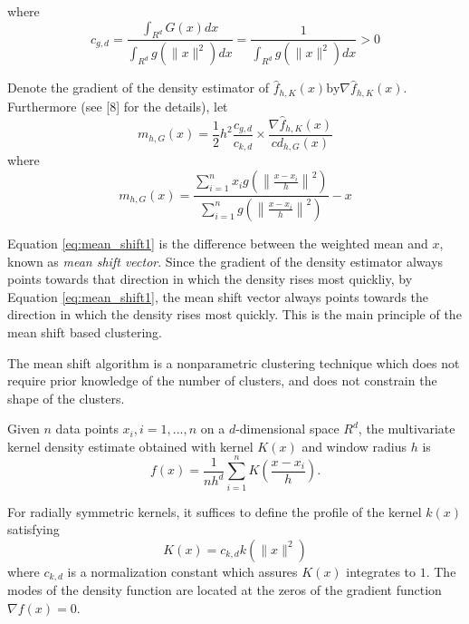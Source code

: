 where
\begin{equation}\label{eq:shadow_constant}
	c_{g,d} = \frac{\int_{R^d} G(x) dx} {\int_{R^d} g(\lVert x \rVert^2) dx} = \frac{1}{\int_{R^d} g(\lVert x \rVert^2) dx} > 0
\end{equation}

Denote the gradient of the density estimator of $\hat{f}_{h,K}(x) \text{by} \nabla \hat{f}_{h,K}(x)$. Furthermore (see [8] for the details), let 
\begin{equation}\label{eq:mean_shift0}
	m_{h,G}(x) = \frac{1}{2}h^2 \frac{c_{g,d}}{c_{k,d}} \times \frac{\nabla \hat{f}_{h,K}(x)}{cd_{h,G}(x)}
\end{equation}
where
\begin{equation}\label{eq:mean_shift1}
	m_{h,G}(x) = \frac{\sum_{i=1}^n x_i g\left(\left\lVert \frac{x - x_i}{h} \right\rVert^2\right)}{\sum_{i=1}^n g\left(\left\lVert \frac{x - x_i}{h} \right\rVert^2\right)} -x
\end{equation}

Equation \eqref{eq:mean_shift1} is the difference between the weighted mean and
$x$, known as \emph{mean shift vector}. Since the gradient of the density estimator always points towards that direction in which the density rises most quickliy, by Equation \eqref{eq:mean_shift1}, the mean shift vector always points towards the direction in which the density rises most quickly. This is the main principle of the mean shift based clustering. 



The mean shift algorithm is a nonparametric clustering technique which does not
require prior knowledge of the number of clusters, and does not constrain the
shape of the clusters. 

Given $n$ data points $x_i, i = 1, ... , n$ on a
$d$-dimensional space $R^d$, the multivariate kernel density estimate obtained
with kernel $K(x)$ and window radius $h$ is
\begin{equation}\label{density_estimator}
	f(x)=\frac{1}{nh^d}\sum_{i=1}^n K(\frac{x-x_i}{h}).
\end{equation}

For radially symmetric kernels, it suffices to define the profile of the kernel
$k(x)$ satisfying
\begin{equation}
	K(x)=c_{k,d}k(\lVert x \rVert^2)
\end{equation}
where $c_{k,d}$ is a normalization constant which assures $K(x)$ integrates to 
$1$. The modes of the density function are located at the zeros of the gradient
function  $\nabla f(x) = 0$.

